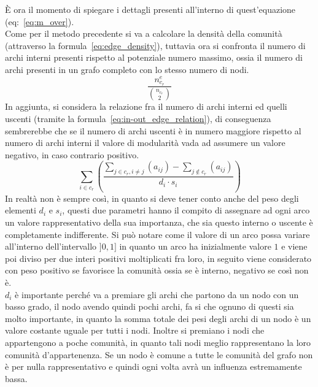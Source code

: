 %
È ora il momento di spiegare i dettagli presenti all'interno di quest'equazione (eq:~\ref{eq:m_over}).\\
Come per il metodo precedente si va a calcolare la densità della comunità (attraverso la formula~\ref{eq:edge_density}), tuttavia ora si confronta il numero di archi interni presenti rispetto al potenziale numero massimo, ossia il numero di archi presenti in un grafo completo con lo stesso numero di nodi.
\begin{equation}
	\frac{ n^e_{c_r} }{ \binom{n_{c_r}}{2} }
	\label{eq:edge_density}
\end{equation}
%
In aggiunta, si considera la relazione fra il numero di archi interni ed quelli uscenti (tramite la formula~\ref{eq:in-out_edge_relation}), di conseguenza sembrerebbe che se il numero di archi uscenti è in numero maggiore rispetto al numero di archi interni il valore di modularità vada ad assumere un valore negativo, in caso contrario positivo.\\
\begin{equation}
	\sum\limits_{i \in c_r} \left( \frac{
		\sum\limits_{j \in c_r, i \neq j} \left( a_{ij} \right) - 
		\sum\limits_{j \notin c_r} \left( a_{ij} \right) 
	} {d_i \cdot s_i} \right)
	\label{eq:in-out_edge_relation}
\end{equation}
In realtà non è sempre così, in quanto si deve tener conto anche del peso degli elementi $d_i$ e $s_i$, questi due parametri hanno il compito di assegnare ad ogni arco un valore rappresentativo della sua importanza, che sia questo interno o uscente è completamente indifferente. Si può notare come il valore di un arco possa variare all'interno dell'intervallo $]0, 1]$ in quanto un arco ha inizialmente valore $1$ e viene poi diviso per due interi positivi moltiplicati fra loro, in seguito viene considerato con peso positivo se favorisce la comunità ossia se è interno, negativo se così non è.\\
$d_i$ è importante perché va a premiare gli archi che partono da un nodo con un basso grado, il nodo avendo quindi pochi archi, fa si che ognuno di questi sia molto importante, in quanto la somma totale dei pesi degli archi di un nodo è un valore costante uguale per tutti i nodi. Inoltre si premiano i nodi che appartengono a poche comunità, in quanto tali nodi meglio rappresentano la loro comunità d'appartenenza. Se un nodo è comune a tutte le comunità del grafo non è per nulla rappresentativo e quindi ogni volta avrà un influenza estremamente bassa.\\
\\
